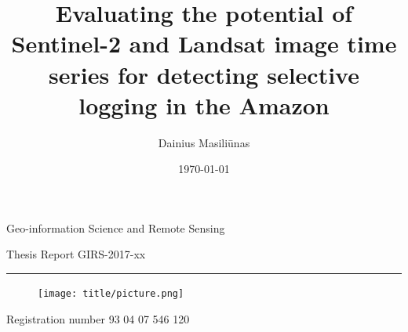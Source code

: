 \documentclass[a4paper,12pt]{scrbook}
\title{Evaluating the potential of Sentinel-2 and Landsat image time series for detecting selective logging in the Amazon}
\author{Dainius Masiliūnas}
\date{\today}
\begin{document}
 \begin{titlingpage}
  {\Large Geo-information Science and Remote Sensing}\vspace{0.9cm}
  
  {\Large Thesis Report GIRS-2017-xx}\vspace{0.9cm}
  
  \hrule\vspace{1.1cm}
  
  {\bfseries \Large \MakeUppercase{\thetitle}}\vspace{2.0cm}
  
  \begin{figure}
    \vspace{1cm}
    \texttt{[image: title/picture.png]}
  \end{figure}
  
  {\Large \theauthor}\vspace{5.5cm}
  
  \vspace{1.5cm}
  
  
  
  \thispagestyle{empty}
  
  \begin{center}
  {\bfseries \Large \thetitle}\vspace{2.7cm}
  
  {\Large \theauthor}\vspace{1.1cm}
  
  {Registration number 93 04 07 546 120}\vspace{3.5cm}
  

\end{center}
\end{titlingpage}
\end{document}
